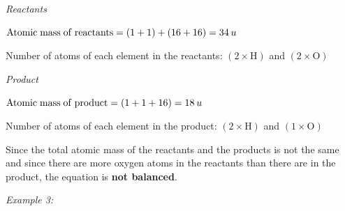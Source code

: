     \addtocounter{footnote}{-0}
    
        \par 
        \label{m38726*id63409}
          \textsl{Reactants}
        \par 
        \label{m38726*id63415}\begin{math}\mathrm{Atomic\; mass\; of\; reactants}=\left(1+1\right)+\left(16+16\right)=\mathrm{34}\phantom{\rule{2pt}{0ex}}u\end{math}\par 
        \label{m38726*id63419}Number of atoms of each element in the reactants: \begin{math}\left(2\ensuremath{\times}\mathrm{H}\right)\end{math} and \begin{math}\left(2\ensuremath{\times}\mathrm{O}\right)\end{math}\par 
        \label{m38726*id63438}
          \textsl{Product}
        \par 
        \label{m38726*id63446}\begin{math}\mathrm{Atomic\; mass\; of\; product}=\left(1+1+16\right)=\mathrm{18}\phantom{\rule{2pt}{0ex}}u\end{math}\par 
        \label{m38726*id63450}Number of atoms of each element in the product: \begin{math}\left(2\ensuremath{\times}\mathrm{H}\right)\end{math} and \begin{math}\left(1\ensuremath{\times}\mathrm{O}\right)\end{math}\par 
        \label{m38726*id63470}Since the total atomic mass of the reactants and the products is not the same and since there are more oxygen atoms in the reactants than there are in the product, the equation is \textbf{not balanced}.\par 
        \label{m38726*id63480}
          \textsl{Example 3:}
        

